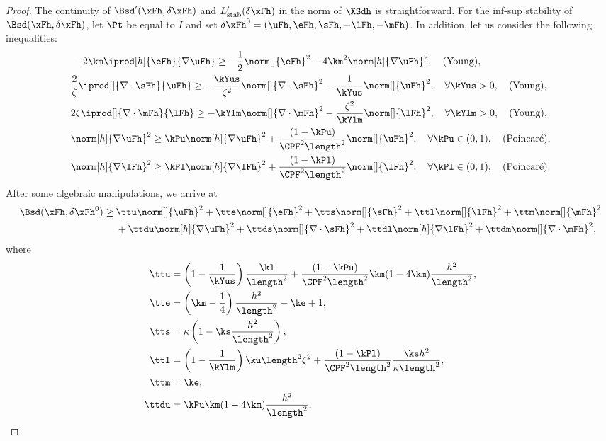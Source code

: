 \begin{proof}
The continuity of $\Bsd'(\xFh,\delta \xFh)$ and $L'_{\mathrm{stab}}(\delta\xFh)$ in the norm of $\XSdh$ is straightforward. For the inf-sup stability of $\Bsd(\xFh,\delta\xFh)$, let $\Pt$ be equal to $I$ and set 
$\delta \xFh^0 = (\uFh,\eFh,\sFh,-\lFh,-\mFh)$.
In addition, let us consider the following inequalities:
\begin{align*}
& -2 \km \iprod[h]{\eFh}{\nabla\uFh} \geq -\frac12\norm[]{\eFh}^2-4 \km^2\norm[h]{\nabla\uFh}^2, \quad\text{(Young)}, \\
%
& \frac{2}{\zeta}\iprod[]{\nabla\cdot\sFh}{\uFh} \geq -\frac{\kYus}{\zeta^2}\norm[]{\nabla\cdot\sFh}^2-\frac{1}{\kYus}\norm[]{\uFh}^2,\quad\forall\kYus > 0,\quad\text{(Young)},\\
%
& 2\zeta\iprod[]{\nabla\cdot\mFh}{\lFh} \geq -\kYlm\norm[]{\nabla\cdot\mFh}^2-\frac{\zeta^2}{\kYlm}\norm[]{\lFh}^2,\quad\forall\kYlm > 0,\quad\text{(Young)},\\
%
&\norm[h]{\nabla\uFh}^2 \geq \kPu\norm[h]{\nabla\uFh}^2+\frac{(1-\kPu)}{\CPF^2\length^2}\norm[]{\uFh}^2,\quad\forall\kPu\in(0,1),\quad\text{(Poincaré)},\\
%
& \norm[h]{\nabla\lFh}^2 \geq \kPl\norm[h]{\nabla\lFh}^2+\frac{(1-\kPl)}{\CPF^2\length^2}\norm[]{\lFh}^2,\quad\forall\kPl\in(0,1),\quad\text{(Poincaré)}.
\end{align*}
After some algebraic manipulations, we arrive at
\begin{align*}
\Bsd(\xFh,\delta\xFh^0) \geq 
&\: \ttu\norm[]{\uFh}^2+
    \tte\norm[]{\eFh}^2+
    \tts\norm[]{\sFh}^2+
    \ttl\norm[]{\lFh}^2+
    \ttm\norm[]{\mFh}^2
    \\    
&\: + \ttdu\norm[h]{\nabla\uFh}^2+
    \ttds\norm[]{\nabla\cdot\sFh}^2+ 
    \ttdl\norm[h]{\nabla\lFh}^2+
    \ttdm\norm[]{\nabla\cdot\mFh}^2,
\end{align*}
where
\begin{align*}
    \ttu&= \left(1-\frac{1}{\kYus}\right)\frac{\kl}{\length^2}+\frac{(1-\kPu)}{\CPF^2\length^2}\km(1-4\km)\frac{h^2}{\length^2},\\
    \tte &= \left(\km-\frac14\right)\frac{h^2}{\length^2}
    -\ke+1,\\
    \tts &= \kappa\left(1-\ks\frac{h^2}{\length^2}\right),\\
    \ttl &= \left(1-\frac{1}{\kYlm}\right)\ku\length^2\zeta^2+\frac{(1-\kPl)}{\CPF^2\length^2}\frac{\ks h^2}{\kappa\length^2},\\
    \ttm &= \ke,\\
    \ttdu &= \kPu\km(1-4\km)\frac{h^2}{\length^2},\\

\end{align*}
\end{proof}
